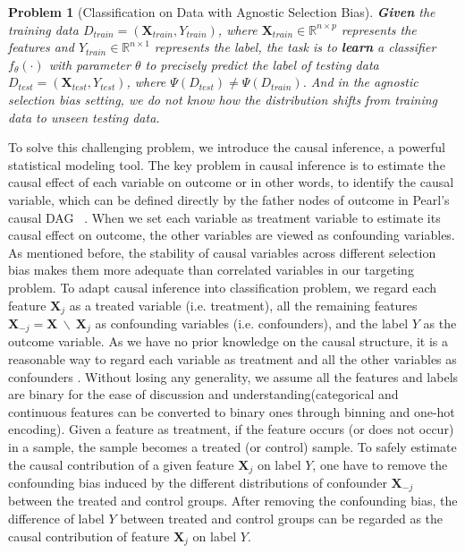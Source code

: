 \documentclass[sigconf]{acmart}
\newtheorem{problem}{Problem}
\begin{document}
\begin{problem}[Classification on Data with Agnostic Selection Bias]
\textbf{Given} the training data $D_{train}=(\bm{X}_{train},Y_{train})$, where $\bm{X}_{train} \in \mathbb{R}^{n\times p}$ represents the features and $Y_{train} \in \mathbb{R}^{n\times 1}$ represents the label, the task is to \textbf{learn} a classifier $f_{\theta}(\cdot)$ with parameter $\theta$ to precisely predict the label of testing data $D_{test} = (\bm{X}_{test}, Y_{test})$, where $\Psi(D_{test})\neq \Psi(D_{train})$. And in the agnostic selection bias setting, we do not know how the distribution shifts from training data to unseen testing data.
\end{problem}

To solve this challenging problem, we introduce the causal inference, a powerful statistical modeling tool.
The key problem in causal inference is to estimate the causal effect of each variable on outcome or in other words, to identify the causal variable, which can be defined directly by the father nodes of outcome in Pearl's causal DAG ~\cite{Pearl2000Causality}.
When we set each variable as treatment variable to estimate its causal effect on outcome, the other variables are viewed as confounding variables.
As mentioned before, the stability of causal variables across different selection bias makes them more adequate than correlated variables in our targeting problem.
To adapt causal inference into classification problem, we regard each feature $\bm{X}_j$ as a treated variable (i.e. treatment), all the remaining features $\bm{X}_{-j} = \bm{X} \ \backslash \  \bm{X}_j$ as confounding variables (i.e. confounders), and the label $Y$ as the outcome variable. 
As we have no prior knowledge on the causal structure, it is a reasonable way to regard each variable as treatment and all the other variables as confounders \cite{hainmueller2011entropy}.
Without losing any generality, we assume all the features and labels are binary for the ease of discussion and understanding(categorical and continuous features can be converted to binary ones through binning and one-hot encoding).
Given a feature as treatment, if the feature occurs (or does not occur) in a sample, the sample becomes a treated (or control) sample.
To safely estimate the causal contribution of a given feature $\bm{X}_j$ on label $Y$, one have to remove the confounding bias induced by the different distributions of confounder $\bm{X}_{-j}$ between the treated and control groups.
After removing the confounding bias, the difference of label $Y$ between treated and control groups can be regarded as the causal contribution of feature $\bm{X}_j$ on label $Y$.
\end{document}
